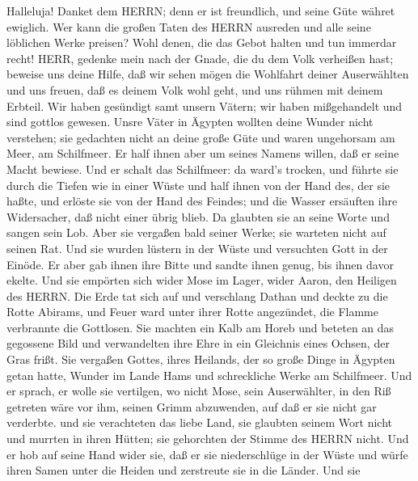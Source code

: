  Halleluja! Danket dem HERRN; denn er ist freundlich, und
seine Güte währet ewiglich.  Wer kann die großen Taten des
HERRN ausreden und alle seine löblichen Werke preisen?  Wohl
denen, die das Gebot halten und tun immerdar recht!  HERR,
gedenke mein nach der Gnade, die du dem Volk verheißen hast; beweise uns
deine Hilfe,  daß wir sehen mögen die Wohlfahrt deiner
Auserwählten und uns freuen, daß es deinem Volk wohl geht, und uns
rühmen mit deinem Erbteil.  Wir haben gesündigt samt unsern
Vätern; wir haben mißgehandelt und sind gottlos gewesen. 
Unsre Väter in Ägypten wollten deine Wunder nicht verstehen; sie
gedachten nicht an deine große Güte und waren ungehorsam am Meer, am
Schilfmeer.  Er half ihnen aber um seines Namens willen, daß
er seine Macht bewiese.  Und er schalt das Schilfmeer: da
ward's trocken, und führte sie durch die Tiefen wie in einer Wüste
 und half ihnen von der Hand des, der sie haßte, und
erlöste sie von der Hand des Feindes;  und die Wasser
ersäuften ihre Widersacher, daß nicht einer übrig blieb. 
Da glaubten sie an seine Worte und sangen sein Lob.  Aber
sie vergaßen bald seiner Werke; sie warteten nicht auf seinen Rat.
 Und sie wurden lüstern in der Wüste und versuchten Gott in
der Einöde.  Er aber gab ihnen ihre Bitte und sandte ihnen
genug, bis ihnen davor ekelte.  Und sie empörten sich wider
Mose im Lager, wider Aaron, den Heiligen des HERRN.  Die
Erde tat sich auf und verschlang Dathan und deckte zu die Rotte Abirams,
 und Feuer ward unter ihrer Rotte angezündet, die Flamme
verbrannte die Gottlosen.  Sie machten ein Kalb am Horeb
und beteten an das gegossene Bild  und verwandelten ihre
Ehre in ein Gleichnis eines Ochsen, der Gras frißt.  Sie
vergaßen Gottes, ihres Heilands, der so große Dinge in Ägypten getan
hatte,  Wunder im Lande Hams und schreckliche Werke am
Schilfmeer.  Und er sprach, er wolle sie vertilgen, wo
nicht Mose, sein Auserwählter, in den Riß getreten wäre vor ihm, seinen
Grimm abzuwenden, auf daß er sie nicht gar verderbte.  und
sie verachteten das liebe Land, sie glaubten seinem Wort nicht
 und murrten in ihren Hütten; sie gehorchten der Stimme des
HERRN nicht.  Und er hob auf seine Hand wider sie, daß er
sie niederschlüge in der Wüste  und würfe ihren Samen unter
die Heiden und zerstreute sie in die Länder.  Und sie
